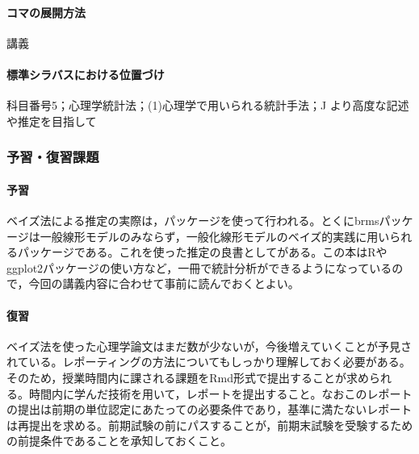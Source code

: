 \paragraph{コマの展開方法}
講義
\paragraph{標準シラバスにおける位置づけ}
科目番号5；心理学統計法；(1)心理学で用いられる統計手法；J より高度な記述や推定を目指して
\subsubsection{予習・復習課題}
\paragraph{予習}
ベイズ法による推定の実際は，パッケージを使って行われる。とくにbrmsパッケージは一般線形モデルのみならず，一般化線形モデルのベイズ的実践に用いられるパッケージである。これを使った推定の良書として\citet{Baba201907}がある。この本はRやggplot2パッケージの使い方など，一冊で統計分析ができるようになっているので，今回の講義内容に合わせて事前に読んでおくとよい。
\paragraph{復習}
ベイズ法を使った心理学論文はまだ数が少ないが，今後増えていくことが予見されている。レポーティングの方法についてもしっかり理解しておく必要がある。そのため，授業時間内に課される課題をRmd形式で提出することが求められる。時間内に学んだ技術を用いて，レポートを提出すること。なおこのレポートの提出は前期の単位認定にあたっての必要条件であり，基準に満たないレポートは再提出を求める。前期試験の前にパスすることが，前期末試験を受験するための前提条件であることを承知しておくこと。

